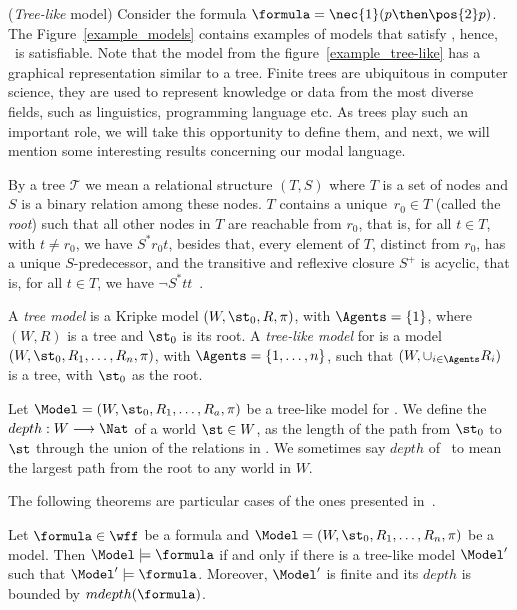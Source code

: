 \begin{example}
    \label{ex2}
    (\emph{Tree-like} model) 
    Consider the formula $\formula = \nec{1} (p \then \pos{2} p)$. The
    Figure~\ref{example_models} contains examples of models that satisfy
    \formula, hence, \formula~is satisfiable. Note that the model from the figure~\ref{example_tree-like} has a
    graphical representation similar to a tree. Finite trees are ubiquitous in
    computer science, they are used to represent knowledge or data from the most
    diverse fields, such as linguistics, programming language etc. As trees play
    such an important role, we will take this opportunity to define them, and
    next, we will mention some interesting results concerning our modal language.


 
    By a tree $\mathcal{T}$ we mean a relational structure $(T, S)$ where $T$ is
    a set of nodes and $S$ is a binary relation among these nodes. $T$
    contains a unique~$r_0 \in T$ (called the \emph{root}) such that all
    other nodes in $T$ are reachable from $r_0$, that is, for all $t \in T$,
    with $t \neq r_0$, we have $S^*r_0 t$, besides that, every element of $T$,
    distinct from $r_0$, has a unique $S$-predecessor, and the transitive and
    reflexive closure $S^+$ is acyclic, that is, for all $t \in T$, we have $\neg
    S^* t t$~\cite{areces2000tree}.

    A \emph{tree model} is a Kripke model $(W, \st_0, R, \pi)$, with $\Agents =
    \{1\}$, where $(W, R)$ is a tree and $\st_0$ is its root. A \emph{tree-like
    model} for  is a model $(W, \st_0, R_1, \ldots, R_n, \pi)$,
    with $\Agents = \{1, \ldots, n\}$, such that $(W, \cup_{i \in \Agents} R_i)$
    is a tree, with $\st_0$ as the root.

    Let $\Model = (W, \st_0, R_1, \ldots, R_a, \pi)$ be a tree-like model for
    . We define the $depth: W \longrightarrow \Nat$ of a world
    $\st \in W$, as the length of the path from $\st_0$ to $\st$ through the
    union of the relations in \Model. We sometimes say $depth$ of \Model~to mean
    the largest path from the root to any world in $W$.

    The following theorems are particular cases of the ones presented
    in~\cite{areces2000tree}.

    \begin{theorem}
        Let $\formula \in \wff$ be a formula and $\Model = (W, \st_0, R_1,
        \ldots, R_n, \pi)$ be a model. Then $\Model \models \formula$ if and only if
        there is a tree-like model $\Model'$ such that $\Model' \models \formula$.
        Moreover, $\Model'$ is finite and its $depth$ is bounded by
        $mdepth(\formula)$.
    \end{theorem}


\end{example}

